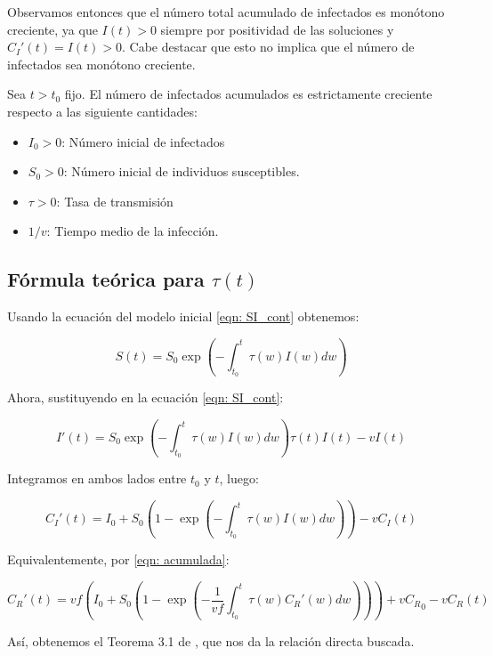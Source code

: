 Observamos entonces que el número total acumulado de infectados es monótono creciente, ya que $I(t)>0$ siempre por positividad de las soluciones y $C_I'(t)=I(t)>0$. Cabe destacar que esto no implica que el número de infectados sea monótono creciente.

\begin{theorem}
Sea $t>t_0$ fijo. El número de infectados acumulados es estrictamente creciente respecto a las siguiente cantidades:
\begin{itemize}
\item $I_0>0$: Número inicial de infectados
\item $S_0>0$: Número inicial de individuos susceptibles.
\item $\tau>0$: Tasa de transmisión
\item $1/v$: Tiempo medio de la infección.
\end{itemize}
\end{theorem}

\subsection{Fórmula teórica para $\tau (t)$}

Usando la ecuación del modelo inicial \eqref{eqn: SI_cont} obtenemos:

$$S(t) = S_0 \exp{\left( - \int_{t_0}^t \tau(w) I(w) dw \right) } $$ 

Ahora, sustituyendo en la ecuación \eqref{eqn: SI_cont}:

$$I'(t) = S_0 \exp{\left( - \int_{t_0}^t \tau(w) I(w) dw \right) } \tau (t) I(t) -vI(t) $$

Integramos en ambos lados entre $t_0$ y $t$, luego:

$$ C_I'(t) = I_0 + S_0 \left( 1-\exp{\left(- \int_{t_0}^t \tau (w) I(w)dw \right)}\right) -vC_I(t)$$

Equivalentemente, por \eqref{eqn: acumulada}:

$$C_R'(t) = vf\left( I_0 + S_0 \left( 1-\exp{\left(- \frac{1}{vf}\int_{t_0}^t \tau (w ) C_R'(w)dw \right)}\right)\right) +v{C_R}_0 -vC_R(t)$$

Así, obtenemos el Teorema 3.1 de \cite{demongeotSIEpidemicModel}, que nos da la relación directa buscada.







